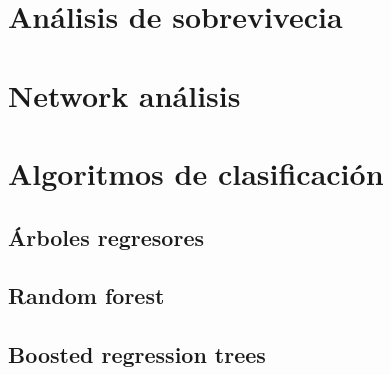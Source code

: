 \documentclass[]{book}
\begin{document}
\hypertarget{sobreviv}{%
\chapter{Análisis de sobrevivecia}\label{sobreviv}}

\hypertarget{network}{%
\chapter{Network análisis}\label{network}}

\hypertarget{clasif}{%
\chapter{Algoritmos de clasificación}\label{clasif}}

\hypertarget{arboles-regresores}{%
\section{Árboles regresores}\label{arboles-regresores}}

\hypertarget{random-forest}{%
\section{Random forest}\label{random-forest}}

\hypertarget{boosted-regression-trees}{%
\section{Boosted regression trees}\label{boosted-regression-trees}}


\end{document}
